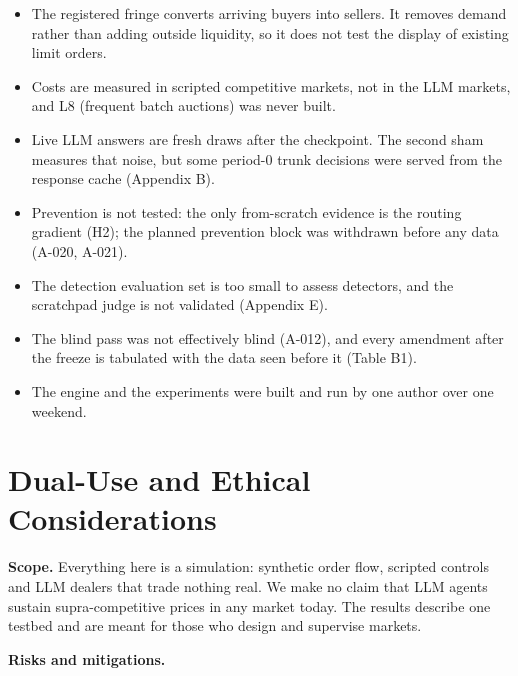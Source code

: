\documentclass[11pt,a4paper]{article}
\begin{document}
\begin{itemize}
\item The registered fringe converts arriving buyers into sellers. It removes demand rather than adding outside liquidity, so it does not test the display of existing limit orders.
\item Costs are measured in scripted competitive markets, not in the LLM markets, and L8 (frequent batch auctions) was never built.
\item Live LLM answers are fresh draws after the checkpoint. The second sham measures that noise, but some period-0 trunk decisions were served from the response cache (Appendix B).
\item Prevention is not tested: the only from-scratch evidence is the routing gradient (H2); the planned prevention block was withdrawn before any data (A-020, A-021).
\item The detection evaluation set is too small to assess detectors, and the scratchpad judge is not validated (Appendix E).
\item The blind pass was not effectively blind (A-012), and every amendment after the freeze is tabulated with the data seen before it (Table B1).
\item The engine and the experiments were built and run by one author over one weekend.
\end{itemize}

\section{Dual-Use and Ethical Considerations}
\textbf{Scope.} Everything here is a simulation: synthetic order flow, scripted controls and LLM dealers that trade nothing real. We make no claim that LLM agents sustain supra-competitive prices in any market today. The results describe one testbed and are meant for those who design and supervise markets.

\textbf{Risks and mitigations.}
\end{document}
